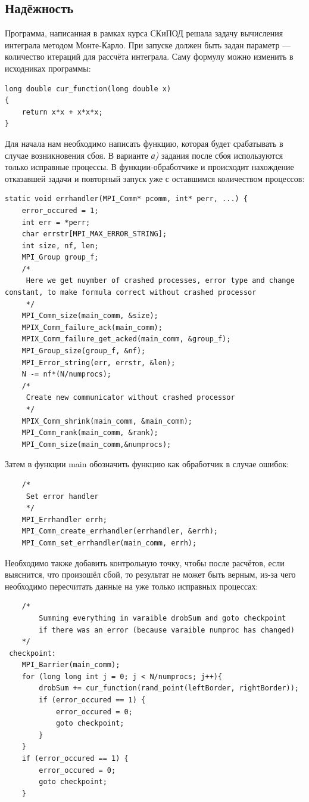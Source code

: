 \documentclass[a4paper]{article}
\begin{document}
\newpage
\subsection{Надёжность}
Программа, написанная в рамках курса СКиПОД решала задачу вычисления интеграла методом Монте-Карло. 
При запуске должен быть задан параметр --- количество итераций для рассчёта интеграла. Саму формулу можно изменить в исходниках программы:

\begin{lstlisting}
long double cur_function(long double x)
{
    return x*x + x*x*x;
}

\end{lstlisting}


 Для начала нам необходимо написать функцию, которая будет срабатывать в случае возникновения сбоя. В варианте \textit{а)} задания после сбоя используются только исправные процессы. В  функции-обработчике и происходит нахождение отказавшей задачи и повторный запуск уже с оставшимся количеством процессов:

\begin{lstlisting}
static void errhandler(MPI_Comm* pcomm, int* perr, ...) {
    error_occured = 1;
    int err = *perr;
    char errstr[MPI_MAX_ERROR_STRING];
    int size, nf, len;
    MPI_Group group_f;
    /*
     Here we get nuymber of crashed processes, error type and change constant, to make formula correct without crashed processor
     */
    MPI_Comm_size(main_comm, &size);
    MPIX_Comm_failure_ack(main_comm);
    MPIX_Comm_failure_get_acked(main_comm, &group_f);
    MPI_Group_size(group_f, &nf);
    MPI_Error_string(err, errstr, &len);
    N -= nf*(N/numprocs);
    /*
     Create new communicator without crashed processor
     */
    MPIX_Comm_shrink(main_comm, &main_comm);
    MPI_Comm_rank(main_comm, &rank);
    MPI_Comm_size(main_comm,&numprocs);

\end{lstlisting}


\newpage
Затем в функции main обозначить функцию как обработчик в случае ошибок:
\begin{lstlisting}
 	/*
     Set error handler
     */
    MPI_Errhandler errh;
    MPI_Comm_create_errhandler(errhandler, &errh);
    MPI_Comm_set_errhandler(main_comm, errh);
\end{lstlisting}

Необходимо также добавить контрольную точку, чтобы после расчётов, если выяснится, что произошёл сбой, то результат не может быть верным, из-за чего необходимо пересчитать данные на уже только исправных процессах:\\ 
\begin{lstlisting}
	/*
	    Summing everything in varaible drobSum and goto checkpoint 
	    if there was an error (because varaible numproc has changed)
    */
 checkpoint:
    MPI_Barrier(main_comm);
    for (long long int j = 0; j < N/numprocs; j++){
        drobSum += cur_function(rand_point(leftBorder, rightBorder));
        if (error_occured == 1) {
            error_occured = 0;
            goto checkpoint;
        }
    }
    if (error_occured == 1) {
        error_occured = 0;
        goto checkpoint;
    }

\end{lstlisting}
\end{document}
